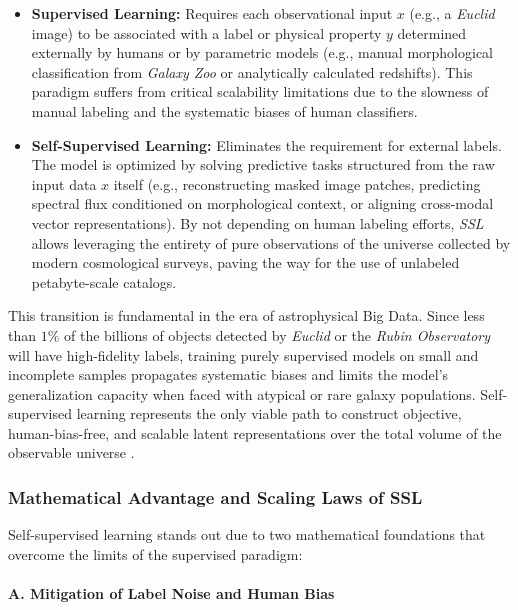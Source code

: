 \begin{itemize}
  \item \textbf{Supervised Learning:} Requires each observational input $x$ (e.g., a \textit{Euclid} image) to be associated with a label or physical property $y$ determined externally by humans or by parametric models (e.g., manual morphological classification from \textit{Galaxy Zoo} or analytically calculated redshifts). This paradigm suffers from critical scalability limitations due to the slowness of manual labeling and the systematic biases of human classifiers.
  
  \item \textbf{Self-Supervised Learning:} Eliminates the requirement for external labels. The model is optimized by solving predictive tasks structured from the raw input data $x$ itself (e.g., reconstructing masked image patches, predicting spectral flux conditioned on morphological context, or aligning cross-modal vector representations). By not depending on human labeling efforts, \textit{\gls{SSL}} allows leveraging the entirety of pure observations of the universe collected by modern cosmological surveys, paving the way for the use of unlabeled petabyte-scale catalogs.
\end{itemize}

This transition is fundamental in the era of astrophysical Big Data. Since less than $1\%$ of the billions of objects detected by \textit{Euclid} or the \textit{Rubin Observatory} will have high-fidelity labels, training purely supervised models on small and incomplete samples propagates systematic biases and limits the model's generalization capacity when faced with atypical or rare galaxy populations. Self-supervised learning represents the only viable path to construct objective, human-bias-free, and scalable latent representations over the total volume of the observable universe \autocites{ar:huertas-company-lanusse-2023}{ar:hayat-2021}{ar:sarmiento-2021}.

\subsubsection{Mathematical Advantage and Scaling Laws of SSL}

Self-supervised learning stands out due to two mathematical foundations that overcome the limits of the supervised paradigm:

\paragraph{A. Mitigation of Label Noise and Human Bias}

